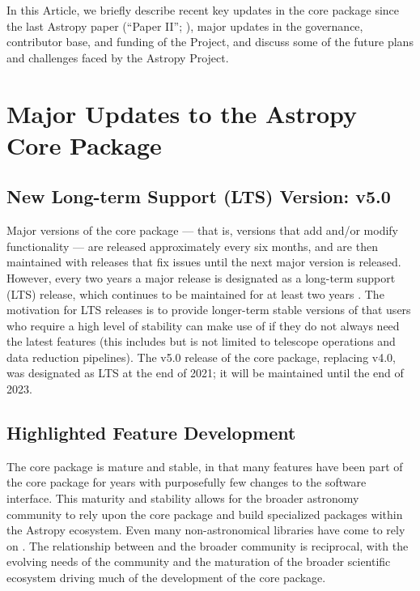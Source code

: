 \documentclass[modern]{aastex631}
\newcommand{\secauthor}[1]{{\color{blue}Author:~\textit{#1}}}
\begin{document}
In this Article, we briefly describe recent key updates in the \astropypkg core
package since the last Astropy paper (``Paper II''; \citealt{astropy:2018}),
major updates in the governance, contributor base, and funding of the Project,
and discuss some of the future plans and challenges faced by the Astropy
Project.


\section{Major Updates to the Astropy Core Package} \label{sec:core-updates}

\subsection{New Long-term Support (LTS) Version: v5.0} \label{sec:core-v50}


Major versions of the core package --- that is, versions that add and/or modify
functionality --- are released approximately every six months, and are then
maintained with releases that fix issues until the next major version is
released. However, every two years a major release is designated as a long-term
support (LTS) release, which continues to be maintained for at least two years
\citep{ape2}. The motivation for LTS releases is to provide longer-term stable
versions of \astropypkg that users who require a high level of stability can
make use of if they do not always need the latest features (this includes but
is not limited to telescope operations and data reduction pipelines). The v5.0
release of the core package, replacing v4.0, was designated as LTS at the end of 2021;
it will be maintained until the end of 2023.

\subsection{Highlighted Feature Development} \label{sec:core-features}


The \astropypkg core package is mature and stable, in that many features have
been part of the core package for years with purposefully few changes to the
software interface. This maturity and stability allows for the broader
astronomy \python community to rely upon the \astropypkg core package and build
specialized packages within the Astropy ecosystem. Even many non-astronomical
\python libraries have come to rely on \astropypkg. The relationship between
\astropy and the broader \python community is reciprocal, with the evolving needs
of the community and the maturation of the broader scientific \python ecosystem
driving much of the development of the \astropypkg core package.
\end{document}
